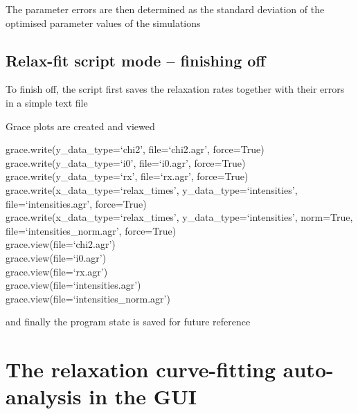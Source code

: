 
The parameter errors are then determined as the standard deviation of the optimised parameter values of the simulations




\subsection{Relax-fit script mode -- finishing off}

To finish off, the script first saves the relaxation rates together with their errors in a simple text file


Grace plots are created and viewed

\begin{exampleenv}
grace.write(y\_data\_type=`chi2', file=`chi2.agr', force=True) \\
grace.write(y\_data\_type=`i0', file=`i0.agr', force=True) \\
grace.write(y\_data\_type=`rx', file=`rx.agr', force=True) \\
grace.write(x\_data\_type=`relax\_times', y\_data\_type=`intensities', file=`intensities.agr', force=True) \\
grace.write(x\_data\_type=`relax\_times', y\_data\_type=`intensities', norm=True, file=`intensities\_norm.agr', force=True) \\
grace.view(file=`chi2.agr') \\
grace.view(file=`i0.agr') \\
grace.view(file=`rx.agr') \\
grace.view(file=`intensities.agr') \\
grace.view(file=`intensities\_norm.agr')
\end{exampleenv}

and finally the program state is saved for future reference





\newpage
\section{The relaxation curve-fitting auto-analysis in the GUI}

